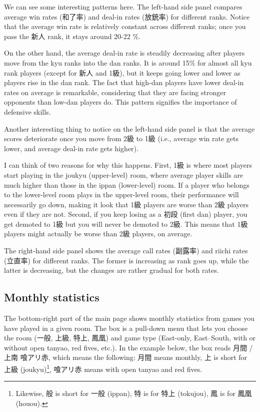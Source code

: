 \bigskip
We can see some interesting patterns here. The left-hand side panel compares average win rates (和了率) and deal-in rates (放銃率) for different ranks. Notice that the average win rate is relatively constant across different ranks; once you pass the 新人 rank, it stays around 20-22 \%. 

\bigskip
On the other hand, the average deal-in rate is steadily decreasing after players move from the {\jap kyu} ranks into the {\jap dan} ranks. It is around 15\% for almost all {\jap kyu} rank players (except for 新人 and 1級), but it keeps going lower and lower as players rise in the {\jap dan} rank. The fact that high-{\jap dan} players have lower deal-in rates on average is remarkable, considering that they are facing stronger opponents than low-{\jap dan} players do. This pattern signifies the importance of defensive skills.

\bigskip

Another interesting thing to notice on the left-hand side panel is that the average scores deteriorate once you move from 2級 to 1級 (i.e., average win rate gets lower, and average deal-in rate gets higher). 

\bigskip
I can think of two reasons for why this happens. First, 1級 is where most players start playing in the {\jap joukyu} (upper-level) room, where average player skills are much higher than those in the {\jap ippan} (lower-level) room. If a player who belongs to the lower-level room plays in the upper-level room, their performance will necessarily go down, making it look that 1級 players are worse than 2級 players even if they are not. Second, if you keep losing as a 初段 (first {\jap dan}) player, you get demoted to 1級 but you will never be demoted to 2級. This means that 1級 players might actually be worse than 2級 players, on average. 

\bigskip

The right-hand side panel shows the average call rates (副露率) and riichi rates (立直率) for different ranks. The former is increasing as rank goes up, while the latter is decreasing, but the changes are rather gradual for both rates. 

\bigskip

\subsection{Monthly statistics}
The bottom-right part of the main page shows monthly statistics from games you have played in a given room. The box is a pull-down menu that lets you choose the room (一般, 上級, 特上, 鳳凰) and game type (East-only, East--South, with or without open {\jap tanyao}, red fives, etc.). In the example below, the box reads 月間 / 上南 喰アリ赤, which means the following: 月間 means monthly, 上 is short for 上級 ({\jap joukyu})\footnote{Likewise, 般 is short for 一般 ({\jap ippan}), 特 is for 特上 ({\jap tokujou}), 鳳 is for 鳳凰 ({\jap houou}).}, 喰アリ赤 means with open {\jap tanyao} and red fives.
\newpage


